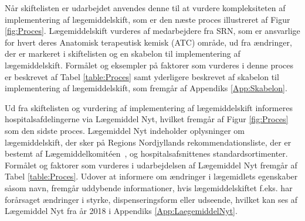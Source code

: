 \begin{table}[H]
\begin{tabular}{p{1.8cm}|p{3.5cm}|p{3.5cm}|p{4.2cm}}
\end{tabular}
\end{table}

Når skiftelisten er udarbejdet anvendes denne til at vurdere kompleksiteten af implementering af lægemiddelskift, som er den næste proces illustreret af Figur \ref{fig:Proces}. Lægemiddelskift vurderes af medarbejdere fra SRN, som er ansvarlige for hvert deres Anatomisk terapeutisk kemisk (ATC) område, ud fra ændringer, der er markeret i skiftelisten og en skabelon til implementering af lægemiddelskift. Formålet og eksempler på faktorer som vurderes i denne proces er beskrevet af Tabel \ref{table:Proces} samt yderligere beskrevet af skabelon til implementering af lægemiddelskift, som fremgår af Appendiks \ref{App:Skabelon}.

Ud fra skiftelisten og vurdering af implementering af lægemiddelskift informeres hospitalsafdelingerne via Lægemiddel Nyt, hvilket fremgår af Figur \ref{fig:Proces} som den sidste proces. Lægemiddel Nyt indeholder oplysninger om lægemiddelskift, der sker på Regions Nordjyllands rekommendationsliste, der er bestemt af Lægemiddelkomitéen~\citep{RegionNordjylland2018}, og hospitalsafsnittenes standardsortimenter. Formålet og faktorer som vurderes i udarbejdelsen af Lægemiddel Nyt fremgår af Tabel \ref{table:Proces}. Udover at informere om ændringer i lægemidlets egenskaber såsom navn, fremgår uddybende informationer, hvis lægemiddelskiftet f.eks. har forårsaget ændringer i styrke, dispenseringsform eller udseende, hvilket kan ses af Lægemiddel Nyt fra år 2018 i Appendiks \ref{App:LaegemiddelNyt}.








